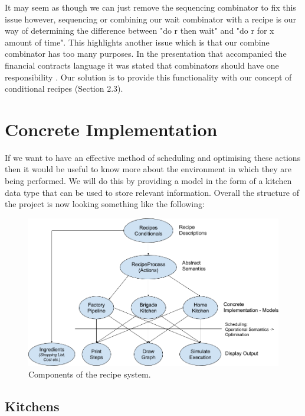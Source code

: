 \documentclass[11pt]{article}
\begin{document}
    It may seem as though we can just remove the sequencing combinator to fix this issue however,
    sequencing or combining our wait combinator with a recipe is our way of determining the
    difference between "do r then wait" and "do r for x amount of time". This highlights another
    issue which is that our combine combinator has too many purposes. In the presentation that
    accompanied the financial contracts language it was stated that combinators should have
    one responsibility \cite{contracts-pp}. Our solution is to provide this functionality 
    with our concept of conditional recipes (Section 2.3). \\

    \section{Concrete Implementation}

    If we want to have an effective method of scheduling and optimising these actions then it would
    be useful to know more about the environment in which they are being performed. We will do this
    by providing a model in the form of a kitchen data type that can be used to store relevant
    information. Overall the structure of the project is now looking something like the following:
    
    \begin{figure}[ht]
        \centering
            \includegraphics[width=\textwidth,keepaspectratio]{recipe_flow.png}
        \caption{Components of the recipe system.}
    \end{figure}

    \subsection{Kitchens}
\end{document}

